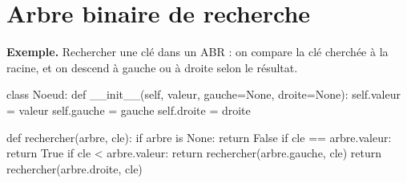 
\section{Arbre binaire de recherche}




\textbf{Exemple.} Rechercher une clé dans un ABR : on compare la clé cherchée à la racine, et on descend à gauche ou à droite selon le résultat.
\begin{python}
class Noeud:
    def __init__(self, valeur, gauche=None, droite=None):
        self.valeur = valeur
        self.gauche = gauche
        self.droite = droite

def rechercher(arbre, cle):
    if arbre is None:
        return False
    if cle == arbre.valeur:
        return True
    if cle < arbre.valeur:
        return rechercher(arbre.gauche, cle)
    return rechercher(arbre.droite, cle)
\end{python}

%
%

